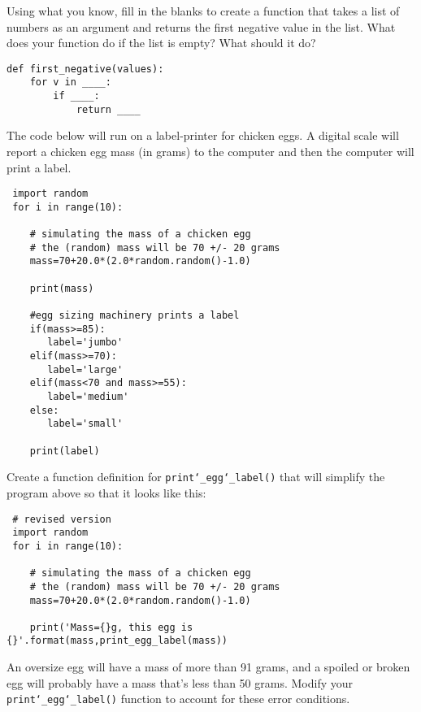 \documentclass[]{article}
\renewcommand{\_}{\char`_}
\begin{document}
\bbq
\bq
Using what you know, fill in the blanks to create a function that takes a list of numbers as an argument and returns the first negative value in the list. What does your function do if the list is empty? What should it do?\eq
\begin{lstlisting}
def first_negative(values):
    for v in ____:
        if ____:
            return ____
\end{lstlisting}

\bq 
The code below will run on a label-printer for chicken eggs. A digital scale will report a chicken egg mass (in grams) to the computer and then the computer will print a label.
\begin{lstlisting}
 import random
 for i in range(10):

    # simulating the mass of a chicken egg
    # the (random) mass will be 70 +/- 20 grams
    mass=70+20.0*(2.0*random.random()-1.0)

    print(mass)
   
    #egg sizing machinery prints a label
    if(mass>=85):
       label='jumbo'
    elif(mass>=70):
       label='large'
    elif(mass<70 and mass>=55):
       label='medium'
    else:
       label='small'
    
    print(label)

\end{lstlisting}
Create a function definition for \texttt{print\_egg\_label()} that will simplify the program above so that it looks like this: 
\begin{lstlisting}
 # revised version
 import random
 for i in range(10):

    # simulating the mass of a chicken egg
    # the (random) mass will be 70 +/- 20 grams
    mass=70+20.0*(2.0*random.random()-1.0)

    print('Mass={}g, this egg is {}'.format(mass,print_egg_label(mass))   
\end{lstlisting}
An oversize egg will have a mass of more than 91 grams, and a spoiled or broken egg will probably have a mass that’s less than 50 grams. Modify your \texttt{print\_egg\_label()} function to account for these error conditions.\eq

\newpage
\end{document}
